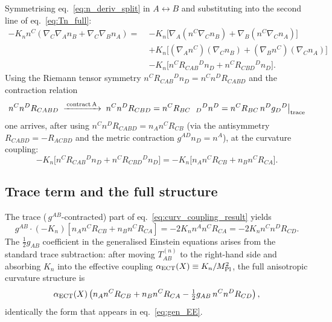 \documentclass[11pt,a4paper]{article}
\numberwithin{equation}{section}
\begin{document}
Symmetrising eq.~\eqref{eq:n_deriv_split} in $A\leftrightarrow B$
and substituting into the second line of eq.~\eqref{eq:Tn_full}:
\begin{align}
-K_n n^C(\nabla_C\nabla_A n_B+\nabla_C\nabla_B n_A)
=\;& -K_n\bigl[
\nabla_A(n^C\nabla_C n_B)
+\nabla_B(n^C\nabla_C n_A)
\bigr]
\nonumber\\
&+K_n\bigl[
(\nabla_A n^C)(\nabla_C n_B)
+(\nabla_B n^C)(\nabla_C n_A)
\bigr]
\nonumber\\
&-K_n\bigl[
n^C R_{CAB}{}^D n_D
+n^C R_{CBD}{}^D n_D
\bigr].
\end{align}
Using the Riemann tensor symmetry
$n^C R_{CAB}{}^D n_D = n^C n^D R_{CABD}$
and the contraction relation
\begin{equation}
n^C n^D R_{CABD}\;\xrightarrow{\,\rm contract\,A\,}
\; n^C n^D R_{CBD} = n^C R_{BC\phantom{D}D}{}^D n^D
= n^C R_{BC}\,n^D g_{D}{}^{D}\big|_{\rm trace}
\end{equation}
one arrives, after using $n^C n^D R_{CABD} = n_A n^C R_{CB}$
(via the antisymmetry $R_{CABD}=-R_{ACBD}$ and the metric
contraction $g^{AD}n_D=n^A$), at the curvature coupling:
\begin{equation}
\label{eq:curv_coupling_result}
-K_n\bigl[n^C R_{CAB}{}^D n_D + n^C R_{CBD}{}^D n_D\bigr]
= -K_n\bigl[n_A n^C R_{CB} + n_B n^C R_{CA}\bigr].
\end{equation}

\subsection{Trace term and the full structure}

The trace (\,$g^{AB}$-contracted) part of eq.~\eqref{eq:curv_coupling_result}
yields
\begin{equation}
g^{AB}\cdot(-K_n)[n_A n^C R_{CB}+n_B n^C R_{CA}]
= -2K_n n^A n^C R_{CA} = -2K_n n^C n^D R_{CD}.
\end{equation}
The $\frac{1}{2}g_{AB}$ coefficient in the generalised Einstein
equations arises from the standard trace subtraction:
after moving $T_{AB}^{(n)}$ to the right-hand side and absorbing
$K_n$ into the effective coupling $\alpha_{\rm ECT}(X)\equiv K_n/M_{\rm Pl}^2$,
the full anisotropic curvature structure is
\begin{equation}
\label{eq:anis_full}
\alpha_{\rm ECT}(X)
\left(
n_A n^C R_{CB}
+n_B n^C R_{CA}
-\tfrac{1}{2}g_{AB}\,n^C n^D R_{CD}
\right),
\end{equation}
identically the form that appears in eq.~\eqref{eq:gen_EE}.
\end{document}
